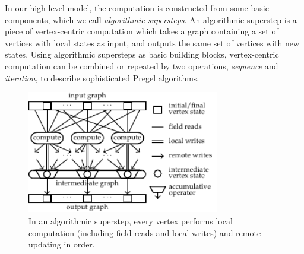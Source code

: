 \documentclass{sokendai_thesis} %
\begin{document}
In our high-level model, the computation is constructed from some basic components, which we call \emph{algorithmic supersteps}.
An algorithmic superstep is a piece of vertex-centric computation which takes a graph containing a set of vertices with local states
as input, and outputs the same set of vertices with new states.
Using algorithmic supersteps as basic building blocks, vertex-centric computation can be combined or repeated by two operations, \emph{sequence} and \emph{iteration}, to describe sophisticated Pregel algorithms.

\begin{figure}[t]
 \centering
 \includegraphics[width=0.75\textwidth]{figures/model.pdf}
 \caption{In an algorithmic superstep, every vertex performs local computation (including field reads and local writes) and remote updating in order.}
 \label{fig:algostep}
 \vspace{-2.5ex}
\end{figure}
\end{document}
